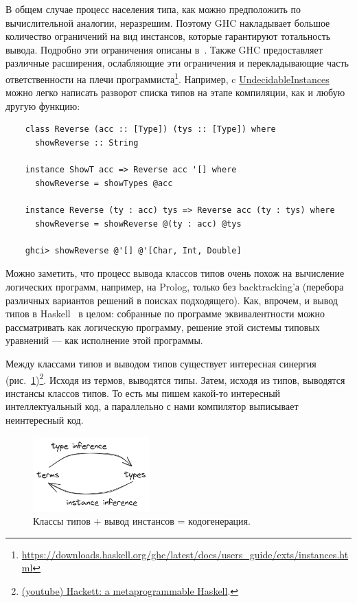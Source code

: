 В общем случае процесс населения типа, как можно предположить по вычислительной аналогии, неразрешим.
Поэтому GHC накладывает большое количество ограничений на вид инстансов, которые гарантируют тотальность вывода.
Подробно эти ограничения описаны в~\cite{sulzmann2007understanding}.
Также GHC предоставляет различные расширения, ослабляющие эти ограничения и перекладывающие часть ответственности на плечи программиста\footnote{\url{https://downloads.haskell.org/ghc/latest/docs/users_guide/exts/instances.html}}.
Например, c \href{https://ghc.gitlab.haskell.org/ghc/doc/users_guide/exts/instances.html\#extension-UndecidableInstances}{UndecidableInstances} можно легко написать разворот списка типов на этапе компиляции, как и любую другую функцию:
\begin{verbatim}
    class Reverse (acc :: [Type]) (tys :: [Type]) where
      showReverse :: String

    instance ShowT acc => Reverse acc '[] where
      showReverse = showTypes @acc

    instance Reverse (ty : acc) tys => Reverse acc (ty : tys) where
      showReverse = showReverse @(ty : acc) @tys

    ghci> showReverse @'[] @'[Char, Int, Double]
\end{verbatim}

Можно заметить, что процесс вывода классов типов очень похож на вычисление логических программ, например, на Prolog, только без backtracking'а (перебора различных вариантов решений в поисках подходящего).
Как, впрочем, и вывод типов в Haskell~\cite{spj-type-inference} в целом: собранные по программе эквивалентности можно рассматривать как логическую программу, решение этой системы типовых уравнений --- как исполнение этой программы.

Между классами типов и выводом типов существует интересная синергия (рис.~\ref{fig:class-sinergy})\footnote{\href{https://youtu.be/5QQdI3P7MdY?si=VAgqyD7iycALTrz_}{(youtube) Hackett: a metaprogrammable Haskell}.}.
Исходя из термов, выводятся типы.
Затем, исходя из типов, выводятся инстансы классов типов.
То есть мы пишем какой-то интересный интеллектуальный код, а параллельно с нами компилятор выписывает неинтересный код.

\begin{figure}[h]
    \centering
    \includegraphics[width=0.4\textwidth]{figs/class-sinergy}
    \caption{Классы типов + вывод инстансов = кодогенерация.}
    \label{fig:class-sinergy}
\end{figure}

